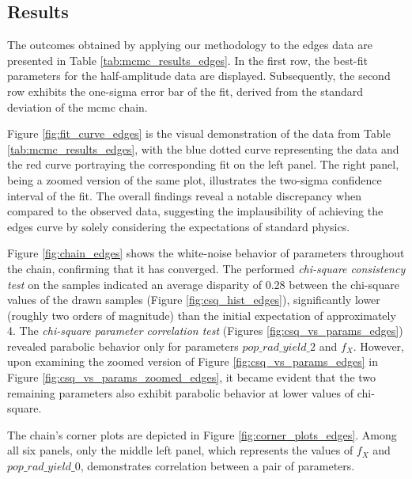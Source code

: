 \documentclass[12pt, TexShade, letterpaper]{report}
\begin{document}
\subsection{Results}
The outcomes obtained by applying our methodology to the \gls{edges} data are presented in Table \ref{tab:mcmc_results_edges}. In the first row, the best-fit parameters for the half-amplitude data are displayed. Subsequently, the second row exhibits the one-sigma error bar of the fit, derived from the standard deviation of the \gls{mcmc} chain. \par
Figure \ref{fig:fit_curve_edges} is the visual demonstration of the data from Table \ref{tab:mcmc_results_edges}, with the blue dotted curve representing the data and the red curve portraying the corresponding fit on the left panel. The right panel, being a zoomed version of the same plot, illustrates the two-sigma confidence interval of the fit. The overall findings reveal a notable discrepancy when compared to the observed data, suggesting the implausibility of achieving the \gls{edges} curve by solely considering the expectations of standard physics.\par
Figure \ref{fig:chain_edges} shows the white-noise behavior of parameters throughout the chain, confirming that it has converged. The performed \emph{chi-square consistency test} on the samples indicated an average disparity of 0.28 between the chi-square values of the drawn samples (Figure \ref{fig:csq_hist_edges}), significantly lower (roughly two orders of magnitude) than the initial expectation of approximately 4. The \emph{chi-square parameter correlation test} (Figures \ref{fig:csq_vs_params_edges}) revealed parabolic behavior only for parameters $pop\_rad\_yield\_2$ and $f_X$. However, upon examining the zoomed version of Figure \ref{fig:csq_vs_params_edges} in Figure \ref{fig:csq_vs_params_zoomed_edges}, it became evident that the two remaining parameters also exhibit parabolic behavior at lower values of chi-square.\par
The chain's corner plots are depicted in Figure \ref{fig:corner_plots_edges}. Among all six panels, only the middle left panel, which represents the values of $f_X$ and $pop\_rad\_yield\_0$, demonstrates correlation between a pair of parameters.
 
\end{document}
